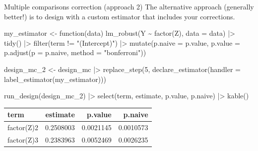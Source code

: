 \documentclass[
  11pt,
  ignorenonframetext,
]{beamer}
\newenvironment{Shaded}{\begin{snugshade}}{\end{snugshade}}
\newcommand{\AttributeTok}[1]{\textcolor[rgb]{0.40,0.45,0.13}{#1}}
\newcommand{\ControlFlowTok}[1]{\textcolor[rgb]{0.00,0.23,0.31}{#1}}
\newcommand{\DecValTok}[1]{\textcolor[rgb]{0.68,0.00,0.00}{#1}}
\newcommand{\FunctionTok}[1]{\textcolor[rgb]{0.28,0.35,0.67}{#1}}
\newcommand{\NormalTok}[1]{\textcolor[rgb]{0.00,0.23,0.31}{#1}}
\newcommand{\OtherTok}[1]{\textcolor[rgb]{0.00,0.23,0.31}{#1}}
\newcommand{\SpecialCharTok}[1]{\textcolor[rgb]{0.37,0.37,0.37}{#1}}
\newcommand{\StringTok}[1]{\textcolor[rgb]{0.13,0.47,0.30}{#1}}
\begin{document}
\begin{frame}[fragile]{Multiple comparisons correction (approach 2)}
\protect\hypertarget{multiple-comparisons-correction-approach-2}{}
The alternative approach (generally better!) is to design with a custom
estimator that includes your corrections.

\begin{Shaded}
\begin{Highlighting}[]
\NormalTok{my\_estimator }\OtherTok{\textless{}{-}} \ControlFlowTok{function}\NormalTok{(data) }
  \FunctionTok{lm\_robust}\NormalTok{(Y }\SpecialCharTok{\textasciitilde{}} \FunctionTok{factor}\NormalTok{(Z), }\AttributeTok{data =}\NormalTok{ data) }\SpecialCharTok{|\textgreater{}} 
  \FunctionTok{tidy}\NormalTok{() }\SpecialCharTok{|\textgreater{}}
  \FunctionTok{filter}\NormalTok{(term }\SpecialCharTok{!=} \StringTok{"(Intercept)"}\NormalTok{) }\SpecialCharTok{|\textgreater{}}
  \FunctionTok{mutate}\NormalTok{(}\AttributeTok{p.naive =}\NormalTok{ p.value,}
         \AttributeTok{p.value =} \FunctionTok{p.adjust}\NormalTok{(}\AttributeTok{p =}\NormalTok{ p.naive, }\AttributeTok{method =} \StringTok{"bonferroni"}\NormalTok{))}
  

\NormalTok{design\_mc\_2 }\OtherTok{\textless{}{-}}\NormalTok{ design\_mc }\SpecialCharTok{|\textgreater{}}
  \FunctionTok{replace\_step}\NormalTok{(}\DecValTok{5}\NormalTok{, }\FunctionTok{declare\_estimator}\NormalTok{(}\AttributeTok{handler =} \FunctionTok{label\_estimator}\NormalTok{(my\_estimator))) }

\FunctionTok{run\_design}\NormalTok{(design\_mc\_2) }\SpecialCharTok{|\textgreater{}} 
  \FunctionTok{select}\NormalTok{(term, estimate, p.value, p.naive) }\SpecialCharTok{|\textgreater{}} \FunctionTok{kable}\NormalTok{()}
\end{Highlighting}
\end{Shaded}

\begin{tabular}{l|r|r|r}
\hline
term & estimate & p.value & p.naive\\
\hline
factor(Z)2 & 0.2508003 & 0.0021145 & 0.0010573\\
\hline
factor(Z)3 & 0.2383963 & 0.0052469 & 0.0026235\\
\hline
\end{tabular}
\end{frame}
\end{document}
